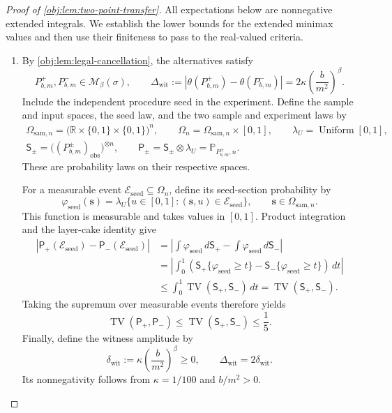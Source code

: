 \documentclass[11pt]{article}
\begin{document}
\begin{proof}[Proof of \cref{obj:lem:two-point-transfer}]
All expectations below are nonnegative extended integrals. We establish the lower bounds for the extended minimax values and then use their finiteness to pass to the real-valued criteria.

\begin{enumerate}
\item
By \cref{obj:lem:legal-cancellation}, the alternatives satisfy
\[
P^+_{b,m},P^-_{b,m}\in\mathcal M_\beta(\sigma),
\qquad
\Delta_{\mathrm{wit}}
:=
\left|\theta(P^+_{b,m})-\theta(P^-_{b,m})\right|
=
2\kappa\left(\frac{b}{m^2}\right)^\beta.
\]
Include the independent procedure seed in the experiment. Define the sample and input spaces, the seed law, and the two sample and experiment laws by
\[
\begin{gathered}
\Omega_{\mathrm{sam},n}
=
\bigl(\mathbb R\times\{0,1\}\times\{0,1\}\bigr)^n,
\qquad
\Omega_n=\Omega_{\mathrm{sam},n}\times[0,1],
\qquad
\lambda_U=\operatorname{Uniform}[0,1],
\\
\mathsf S_\pm
=
\bigl((P^\pm_{b,m})_{\mathrm{obs}}\bigr)^{\otimes n},
\qquad
\mathsf P_\pm
=
\mathsf S_\pm\otimes\lambda_U
=
\mathbb P_{P^\pm_{b,m},n}.
\end{gathered}
\]
These are probability laws on their respective spaces.

For a measurable event \(\mathcal E_{\mathrm{seed}}\subseteq\Omega_n\), define its seed-section probability by
\[
\varphi_{\mathrm{seed}}(\mathbf s)
=
\lambda_U\{u\in[0,1]:(\mathbf s,u)\in\mathcal E_{\mathrm{seed}}\},
\qquad
\mathbf s\in\Omega_{\mathrm{sam},n}.
\]
This function is measurable and takes values in \([0,1]\). Product integration and the layer-cake identity give
\[
\begin{aligned}
\left|
\mathsf P_+(\mathcal E_{\mathrm{seed}})
-
\mathsf P_-(\mathcal E_{\mathrm{seed}})
\right|
&=
\left|
\int\varphi_{\mathrm{seed}}\,d\mathsf S_+
-
\int\varphi_{\mathrm{seed}}\,d\mathsf S_-
\right|
\\
&=
\left|
\int_0^1
\left(
\mathsf S_+\{\varphi_{\mathrm{seed}}\ge t\}
-
\mathsf S_-\{\varphi_{\mathrm{seed}}\ge t\}
\right)\,dt
\right|
\\
&\le
\int_0^1\operatorname{TV}(\mathsf S_+,\mathsf S_-)\,dt
=
\operatorname{TV}(\mathsf S_+,\mathsf S_-).
\end{aligned}
\]
Taking the supremum over measurable events therefore yields
\[
\operatorname{TV}(\mathsf P_+,\mathsf P_-)
\le
\operatorname{TV}(\mathsf S_+,\mathsf S_-)
\le\frac15.
\]
Finally, define the witness amplitude by
\[
\delta_{\mathrm{wit}}
:=
\kappa\left(\frac{b}{m^2}\right)^\beta
\ge0,
\qquad
\Delta_{\mathrm{wit}}=2\delta_{\mathrm{wit}}.
\]
Its nonnegativity follows from \(\kappa=1/100\) and \(b/m^2>0\).


\end{enumerate}
\end{proof}
\end{document}
